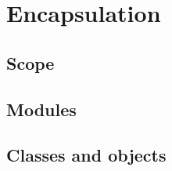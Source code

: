 \chapter{Encapsulation}\label{chapter:encapsulation}

\section{Scope}

\section{Modules}

\section{Classes and objects}
